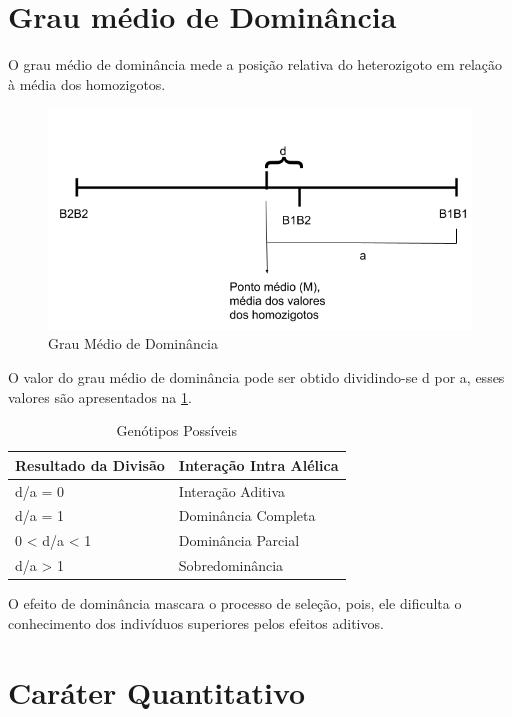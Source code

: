 \section{Grau médio de Dominância}

O grau médio de dominância mede a posição relativa do heterozigoto em relação à média dos homozigotos. 

\begin{figure}[h]
  \includegraphics[width=0.9\linewidth]{img/grau-medio-dominancia.png}
  \caption{Grau Médio de Dominância}
  \label{fig:boat1}
\end{figure}


O valor do grau médio de dominância pode ser obtido dividindo-se d por a, esses valores são apresentados na \ref{fig:boat1}.


\begin{table}[H]
\centering
\begin{tabular}{l l }
\toprule
 \textbf{Resultado da Divisão} & \textbf{Interação Intra Alélica} \\
\midrule
 d/a = 0     & Interação  Aditiva  \\
 d/a = 1     & Dominância Completa \\
 0 < d/a < 1 & Dominância Parcial  \\
 d/a > 1     & Sobredominância     \\
\bottomrule
\end{tabular}
\caption{Genótipos Possíveis} \label{tab:t04}
\end{table}

O efeito de dominância mascara o processo de seleção, pois, ele dificulta o conhecimento dos indivíduos superiores pelos efeitos aditivos.

\section{Caráter Quantitativo}

